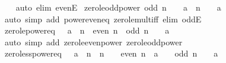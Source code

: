 \begin{isabellebody}
%
\isadelimproof
\ \ %
\endisadelimproof
%
\isatagproof
{}\isamarkupfalse%
\ {\isacharparenleft}{\kern0pt}auto\ elim{\isacharcolon}{\kern0pt}\ evenE{\isacharparenright}{\kern0pt}%
\endisatagproof
{\isafoldproof}%
%
\isadelimproof
\isanewline
%
\endisadelimproof
\isanewline
{}\isamarkupfalse%
\ zero{\isacharunderscore}{\kern0pt}le{\isacharunderscore}{\kern0pt}odd{\isacharunderscore}{\kern0pt}power{\isacharcolon}{\kern0pt}\ {\isachardoublequoteopen}odd\ n\ {\isasymLongrightarrow}\ {}\ {\isasymle}\ a\ {\isacharcircum}{\kern0pt}\ n\ {\isasymlongleftrightarrow}\ {}\ {\isasymle}\ a{\isachardoublequoteclose}\isanewline
%
\isadelimproof
\ \ %
\endisadelimproof
%
\isatagproof
{}\isamarkupfalse%
\ {\isacharparenleft}{\kern0pt}auto\ simp\ add{\isacharcolon}{\kern0pt}\ power{\isacharunderscore}{\kern0pt}even{\isacharunderscore}{\kern0pt}eq\ zero{\isacharunderscore}{\kern0pt}le{\isacharunderscore}{\kern0pt}mult{\isacharunderscore}{\kern0pt}iff\ elim{\isacharcolon}{\kern0pt}\ oddE{\isacharparenright}{\kern0pt}%
\endisatagproof
{\isafoldproof}%
%
\isadelimproof
\isanewline
%
\endisadelimproof
\isanewline
{}\isamarkupfalse%
\ zero{\isacharunderscore}{\kern0pt}le{\isacharunderscore}{\kern0pt}power{\isacharunderscore}{\kern0pt}eq{\isacharcolon}{\kern0pt}\ {\isachardoublequoteopen}{}\ {\isasymle}\ a\ {\isacharcircum}{\kern0pt}\ n\ {\isasymlongleftrightarrow}\ even\ n\ {\isasymor}\ odd\ n\ {\isasymand}\ {}\ {\isasymle}\ a{\isachardoublequoteclose}\isanewline
%
\isadelimproof
\ \ %
\endisadelimproof
%
\isatagproof
{}\isamarkupfalse%
\ {\isacharparenleft}{\kern0pt}auto\ simp\ add{\isacharcolon}{\kern0pt}\ zero{\isacharunderscore}{\kern0pt}le{\isacharunderscore}{\kern0pt}even{\isacharunderscore}{\kern0pt}power\ zero{\isacharunderscore}{\kern0pt}le{\isacharunderscore}{\kern0pt}odd{\isacharunderscore}{\kern0pt}power{\isacharparenright}{\kern0pt}%
\endisatagproof
{\isafoldproof}%
%
\isadelimproof
\isanewline
%
\endisadelimproof
\isanewline
{}\isamarkupfalse%
\ zero{\isacharunderscore}{\kern0pt}less{\isacharunderscore}{\kern0pt}power{\isacharunderscore}{\kern0pt}eq{\isacharcolon}{\kern0pt}\ {\isachardoublequoteopen}{}\ {\isacharless}{\kern0pt}\ a\ {\isacharcircum}{\kern0pt}\ n\ {\isasymlongleftrightarrow}\ n\ {\isacharequal}{\kern0pt}\ {}\ {\isasymor}\ even\ n\ {\isasymand}\ a\ {\isasymnoteq}\ {}\ {\isasymor}\ odd\ n\ {\isasymand}\ {}\ {\isacharless}{\kern0pt}\ a{\isachardoublequoteclose}\isanewline
%

\end{isabellebody}
